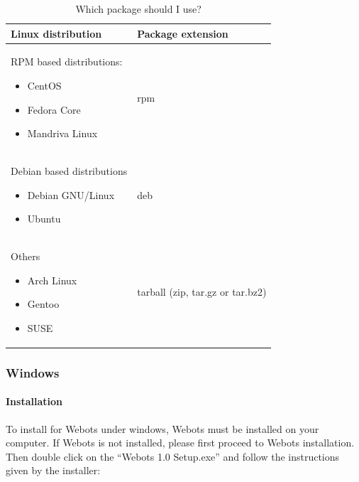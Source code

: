 \begin{table}[htbp]
  \begin{center}
    \begin{tabular}{p{.4\linewidth}l}
      \hline
      Linux distribution &    Package extension\\
      \hline
      RPM based distributions:
      \begin{itemize}
      \item CentOS
      \item Fedora Core
      \item Mandriva Linux
      \end{itemize}
      &
      rpm\\
      Debian based distributions
      \begin{itemize}
      \item Debian GNU/Linux
      \item Ubuntu
      \end{itemize}
      &
      deb \\
      Others
      \begin{itemize}
      \item Arch Linux
      \item Gentoo
      \item SUSE
      \end{itemize}
      &
      tarball (zip, tar.gz or tar.bz2)\\
      \hline
    \end{tabular}
  \end{center}
  \caption{Which package should I use?}
  \end{table}

\subsubsection{Windows}

\paragraph{Installation}

To install \urbi for Webots under windows, Webots must be installed on
your computer. If Webots is not installed, please first proceed to
Webots installation. Then double click on the ``\urbi Webots 1.0
Setup.exe'' and follow the instructions given by the installer:

